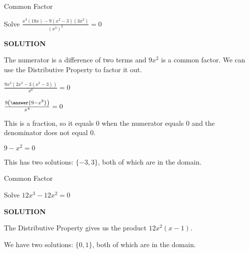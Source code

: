 \documentclass{ximera}
\begin{document}
\begin{example}  Common Factor


Solve $\frac{x^3 (18x) - 9(x^2-3)(3x^2)}{(x^3)^2} = 0$



\textbf{\textcolor{purple!50!blue!90!black}{SOLUTION}}


The numerator is a difference of two terms and $9 x^2$ is a common factor.  We can use the Distributive Property to factor it out.



$\frac{9x^2 (2x^2 - 3(x^2-3))}{x^6} = 0$


$\frac{9 \left( \answer{9 - x^2} \right)}{x^4} = 0$



This is a fraction, so it equals $0$ when the numerator equals $0$ and the denominator does not equal $0$.


$9 - x^2 = 0$

This has two solutions: $\{ -3, 3  \}$, both of which are in the domain.








\end{example}

















\begin{example}  Common Factor


Solve $12 x^3 - 12 x^2 = 0$



\textbf{\textcolor{purple!50!blue!90!black}{SOLUTION}}


The Distributive Property gives us the product $12 x^2 (x-1)$.




We have two solutions: $\{ 0, 1  \}$, both of which are in the domain.



\end{example}
\end{document}
